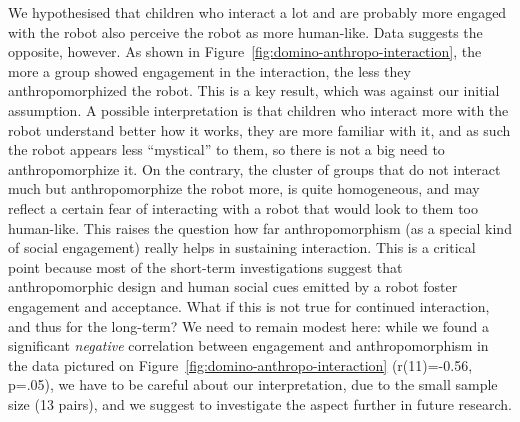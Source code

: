 \documentclass[letterpaper, 10pt, conference]{ieeeconf}
\begin{document}
We hypothesised that children who interact a lot and are probably more engaged
with the robot also perceive the robot as more human-like. Data suggests the
opposite, however. As shown in Figure~\ref{fig:domino-anthropo-interaction}, 
the more a group showed engagement in the interaction, the less they
anthropomorphized the robot. This is a key result, which was against our
initial assumption. A possible interpretation is that children who interact more
with the robot understand better how it works, they are more familiar with it,
and as such the robot appears less ``mystical'' to them, so there is not a big
need to anthropomorphize it. On the contrary, the cluster of groups that do not
interact much but anthropomorphize the robot more, is quite homogeneous, and may
reflect a certain fear of interacting with a robot that would look to them too
human-like.
This raises the question how far anthropomorphism (as a special kind of social
engagement) really helps in sustaining interaction. This is a critical point
because most of the short-term investigations suggest that anthropomorphic
design and human social cues emitted by a robot foster engagement and
acceptance. What if this is not true for continued interaction, and thus for the
long-term? We need to remain modest here: while we found a significant
\emph{negative} correlation between engagement and anthropomorphism in the data
pictured on Figure~\ref{fig:domino-anthropo-interaction} (r(11)=-0.56, p=.05),
we have to be careful about our interpretation, due to the small sample size (13
pairs), and we suggest to investigate the aspect further in future research.
\end{document}
